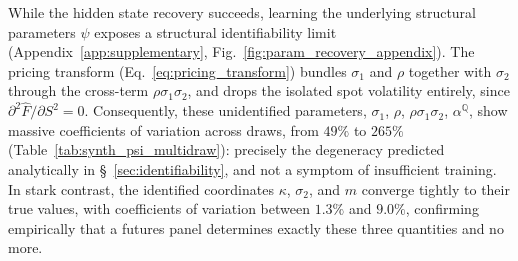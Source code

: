 \documentclass[11pt, a4paper]{article}
\begin{document}
\begin{table}[h!]
\centering
\footnotesize
\caption{Latent-state recovery on the synthetic futures panel, run across five independent seeds. The closed-form baseline solves Eq.~\ref{eq:ls_delta} with $\psi$ profiled out, requiring no training; MLP and AP-PEN are statistically indistinguishable here. The increment ratio measures the standard deviation of the recovered day-to-day changes relative to the true changes, effectively comparing the volatility of the model's estimates against the actual data.}
\label{tab:synth_delta_recovery}
\footnotesize
{}
\end{table}

While the hidden state recovery succeeds, learning the underlying structural parameters $\psi$ exposes a structural identifiability limit (Appendix~\ref{app:supplementary}, Fig.~\ref{fig:param_recovery_appendix}). The pricing transform (Eq.~\ref{eq:pricing_transform}) bundles $\sigma_1$ and $\rho$ together with $\sigma_2$ through the cross-term $\rho\sigma_1\sigma_2$, and drops the isolated spot volatility entirely, since $\partial^2\hat F/\partial S^2 = 0$. Consequently, these unidentified parameters, $\sigma_1$, $\rho$, $\rho\sigma_1\sigma_2$, $\alpha^{\mathbb{Q}}$, show massive coefficients of variation across draws, from $49\%$ to $265\%$ (Table~\ref{tab:synth_psi_multidraw}): precisely the degeneracy predicted analytically in \S~\ref{sec:identifiability}, and not a symptom of insufficient training. In stark contrast, the identified coordinates $\kappa$, $\sigma_2$, and $m$ converge tightly to their true values, with coefficients of variation between $1.3\%$ and $9.0\%$, confirming empirically that a futures panel determines exactly these three quantities and no more.
\end{document}
